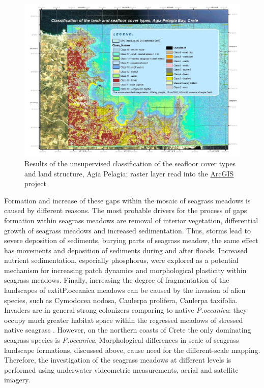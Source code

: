 \documentclass[10pt, a4paper]{article}
\begin{document}
\begin{figure}[h]
	\begin{center}
		\includegraphics[scale=0.25]{Fig-39.jpg}
		\caption{Results of the unsupervised classification of the seafloor cover types and land structure, Agia Pelagia; raster layer read into the \href{http://www.esri.com/software/arcgis/index.html}{ArcGIS} project}
		\label{fig:42}
	\end{center}
\end{figure}

Formation and increase of these
gaps within the mosaic of seagrass meadows is caused by different reasons. The most probable
drivers for the process of gaps formation within seagrass meadows are removal of interior vegetation,
differential growth of seagrass meadows and increased sedimentation. Thus, storms lead to severe
deposition of sediments, burying parts of seagrass meadow, the same effect has movements and
deposition of sediments during and after floods\cite{Bell99}\label{Bell99}.
Increased nutrient sedimentation, especially phosphorus, were explored \cite{Jensen01}\label{Jensen01} as a
potential mechanism for increasing patch dynamics and morphological plasticity within seagrass
meadows. Finally, increasing the degree of fragmentation of the landscapes of 	extit{P.oceanica} meadows
can be caused by the invasion of alien species, such as Cymodocea nodosa, Caulerpa prolifera,
Caulerpa taxifolia. Invaders are in general strong colonizers comparing to native \textit{P.oceanica}: they
occupy much greater habitat space within the regressed meadows of stressed native seagrass
\cite{Montefalcone10}\label{Montefalcone10}. However, on the northern coasts of Crete the only dominating seagrass
species is \textit{P.oceanica}.
Morphological differences in scale of seagrass landscape formations, discussed above, cause need for
the different-scale mapping. Therefore, the investigation of the seagrass meadows at different levels is
performed using underwater videometric measurements, aerial and satellite imagery.
\end{document}
